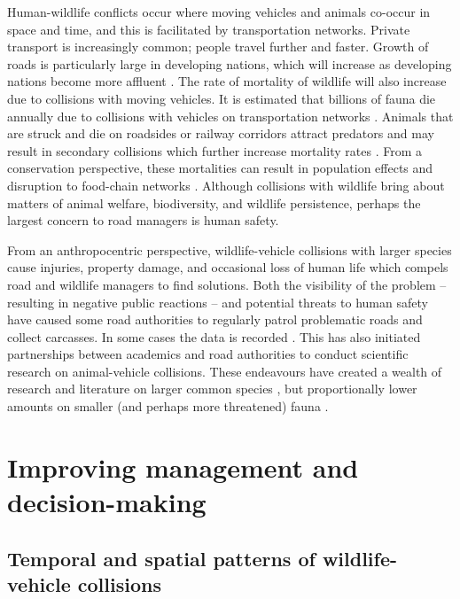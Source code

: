 Human-wildlife conflicts occur where moving vehicles and animals co-occur in space and time, and this is facilitated by transportation networks. Private transport is increasingly common; people travel further and faster. Growth of roads is particularly large in developing nations, which will increase as developing nations become more affluent \citep{rvdr15}. The rate of mortality of wildlife will also increase due to collisions with moving vehicles. It is estimated that billions of fauna die annually due to collisions with vehicles on transportation networks \citep{seil06}. Animals that are struck and die on roadsides or railway corridors attract predators and may result in secondary collisions which further increase mortality rates \citep{spel98}. From a conservation perspective, these mortalities can result in population effects and disruption to food-chain networks \citep{ramp06b,cham10,pola14}.  Although collisions with wildlife bring about matters of animal welfare, biodiversity, and wildlife persistence, perhaps the largest concern to road managers is human safety. 

From an anthropocentric perspective, wildlife-vehicle collisions with larger species cause injuries, property damage, and occasional loss of human life which compels road and wildlife managers to find solutions. Both the visibility of the problem -- resulting in negative public reactions -- and potential threats to human safety have caused some road authorities to regularly patrol problematic roads and collect carcasses. In some cases the data is recorded \citep{huij07a}. This has also initiated partnerships between academics and road authorities to conduct scientific research on animal-vehicle collisions.  These endeavours have created a wealth of research and literature on larger common species \citep{biss08b,clev02,romi96,sudh09}, but proportionally lower amounts on smaller (and perhaps more threatened) fauna \citep{clev03}.

\section{Improving management and decision-making}

\subsection{Temporal and spatial patterns of wildlife-vehicle collisions}

